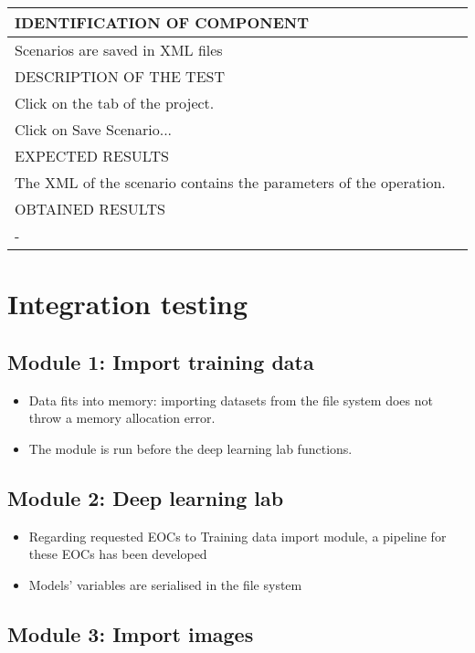 \documentclass{polytech/polytech}
\numberwithin{figure}{chapter}
\begin{document}
\begin{appendix}
\begin{table}[]
\begin{tabular}{|l|l|}\hline
\color{C} IDENTIFICATION OF COMPONENT \\\hline
Scenarios are saved in XML files  \\\hline
\color{C} DESCRIPTION OF THE TEST\\\hline
Click on the tab of the project.\\ Click on Save Scenario... \\\hline
\color{C} EXPECTED RESULTS \\\hline
The XML of the scenario contains the parameters of the operation. \\\hline
\color{C} OBTAINED RESULTS \\\hline
- \\\hline
\end{tabular}
\end{table}

\section{Integration testing}

\subsection{Module 1: Import training data}

\begin{itemize}
\item Data fits into memory: importing datasets from the file system does not throw a memory allocation error.
\item The module is run before the deep learning lab functions.
\end{itemize}

\subsection{Module 2: Deep learning lab}

\begin{itemize}
\item Regarding requested EOCs to Training data import module, a pipeline for these EOCs has been developed
\item Models’ variables are serialised in the file system
\end{itemize}

\subsection{Module 3: Import images}


\end{appendix}
\end{document}
